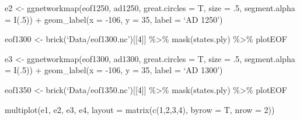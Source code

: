 \documentclass[]{article}
\begin{document}
e2 \textless{}- ggnetworkmap(eof1250, ad1250, great.circles = T, size =
.5, segment.alpha = I(.5)) + geom\_label(x = -106, y = 35, label = `AD
1250')

eof1300 \textless{}- brick(`Data/eof1300.nc'){[}{[}4{]}{]}
\%\textgreater{}\% mask(states.ply) \%\textgreater{}\% plotEOF

e3 \textless{}- ggnetworkmap(eof1300, ad1300, great.circles = T, size =
.5, segment.alpha = I(.5)) + geom\_label(x = -106, y = 35, label = `AD
1300')

eof1350 \textless{}- brick(`Data/eof1350.nc'){[}{[}4{]}{]}
\%\textgreater{}\% mask(states.ply) \%\textgreater{}\% plotEOF

multiplot(e1, e2, e3, e4, layout = matrix(c(1,2,3,4), byrow = T, nrow =
2))
\end{document}
